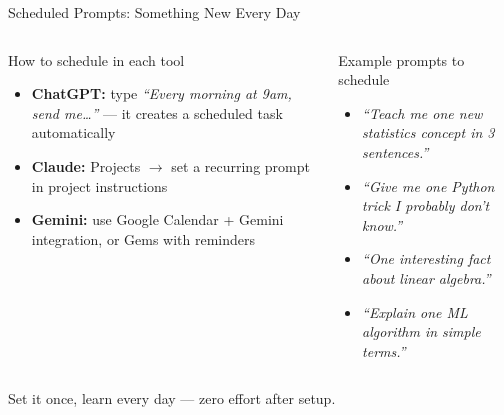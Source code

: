 \documentclass[aspectratio=169]{beamer}
\begin{document}
\begin{frame}{Scheduled Prompts: Something New Every Day}
\small
\begin{center}
\end{center}

\smallskip
\begin{columns}[T]
\begin{block}{How to schedule in each tool}
\begin{itemize}\setlength\itemsep{0em}
  \item \textbf{ChatGPT:} type \textit{``Every morning at 9am, send me\ldots''} --- it creates a scheduled task automatically
  \item \textbf{Claude:} Projects $\to$ set a recurring prompt in project instructions
  \item \textbf{Gemini:} use Google Calendar + Gemini integration, or Gems with reminders
\end{itemize}
\end{block}

\begin{exampleblock}{Example prompts to schedule}
\begin{itemize}\setlength\itemsep{0em}
  \item \textit{``Teach me one new statistics concept in 3 sentences.''}
  \item \textit{``Give me one Python trick I probably don't know.''}
  \item \textit{``One interesting fact about linear algebra.''}
  \item \textit{``Explain one ML algorithm in simple terms.''}
\end{itemize}
\end{exampleblock}
\end{columns}

\medskip
\begin{center}
\small\color{paramgreen}
Set it once, learn every day --- zero effort after setup.
\end{center}
\end{frame}
\end{document}
